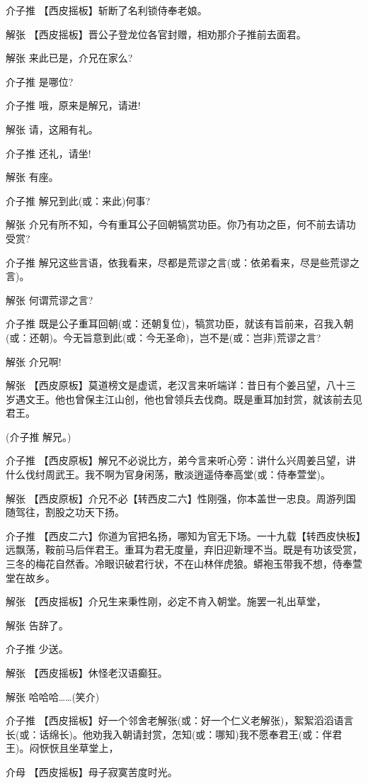介子推 【西皮摇板】斩断了名利锁侍奉老娘。

解张 【西皮摇板】晋公子登龙位各官封赠，相劝那介子推前去面君。

解张 来此已是，介兄在家么?

介子推 是哪位?

介子推 哦，原来是解兄，请进!

解张 请，这厢有礼。

介子推 还礼，请坐!

解张 有座。

介子推 解兄到此(或：来此)何事?

解张
介兄有所不知，今有重耳公子回朝犒赏功臣。你乃有功之臣，何不前去请功受赏?

介子推
解兄这些言语，依我看来，尽都是荒谬之言(或：依弟看来，尽是些荒谬之言)。

解张 何谓荒谬之言?

介子推
既是公子重耳回朝(或：还朝复位)，犒赏功臣，就该有旨前来，召我入朝(或：还朝)。今无旨意到此(或：今无圣命)，岂不是(或：岂非)荒谬之言?

解张 介兄啊!

解张
【西皮原板】莫道榜文是虚谎，老汉言来听端详：昔日有个姜吕望，八十三岁遇文王。他也曾保主江山创，他也曾领兵去伐商。既是重耳加封赏，就该前去见君王。

(介子推 解兄。)

介子推
【西皮原板】解兄不必说比方，弟今言来听心旁：讲什么兴周姜吕望，讲什么伐纣周武王。我不啊为官身闲荡，散淡逍遥侍奉高堂(或：侍奉萱堂)。

解张
【西皮原板】介兄不必【转西皮二六】性刚强，你本盖世一忠良。周游列国随驾往，割股之功天下扬。

介子推
【西皮二六】你道为官把名扬，哪知为官无下场。一十九载【转西皮快板】远飘荡，鞍前马后伴君王。重耳为君无度量，弃旧迎新理不当。既是有功该受赏，三冬的梅花自然香。冷眼识破君行状，不在山林伴虎狼。蟒袍玉带我不想，侍奉萱堂在故乡。

解张 【西皮摇板】介兄生来秉性刚，必定不肯入朝堂。施罢一礼出草堂，

解张 告辞了。

介子推 少送。

解张 【西皮摇板】休怪老汉语癫狂。

解张 哈哈哈\ldots{}\ldots{}(笑介)

介子推
【西皮摇板】好一个邻舍老解张(或：好一个仁义老解张)，絮絮滔滔语言长(或：话绵长)。他劝我入朝请封赏，怎知(或：哪知)我不愿奉君王(或：伴君王)。闷恹恹且坐草堂上，

介母 【西皮摇板】母子寂寞苦度时光。

